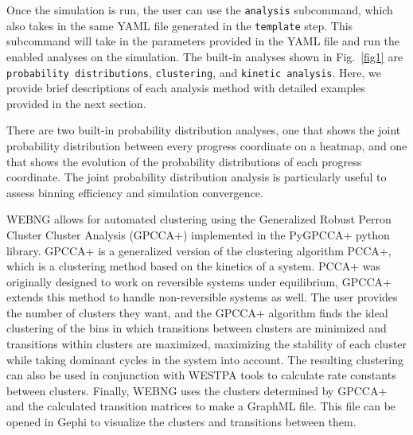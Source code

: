 \documentclass[10pt,letterpaper]{article}
\begin{document}
Once the simulation is run, the user can use the \texttt{analysis} subcommand, which also takes in the same YAML file generated in the \texttt{template} step. This subcommand will take in the parameters provided in the YAML file and run the enabled analyses on the simulation. The built-in analyses shown in Fig.~\ref{fig1} are \texttt{probability distributions}, \texttt{clustering}, and \texttt{kinetic analysis}. Here, we provide brief descriptions of each analysis method with detailed examples provided in the next section. 

There are two built-in probability distribution analyses, one that shows the joint probability distribution between every progress coordinate on a heatmap, and one that shows the evolution of the probability distributions of each progress coordinate. The joint probability distribution analysis is particularly useful to assess binning efficiency and simulation convergence. 

WEBNG allows for automated clustering using the Generalized Robust Perron Cluster Cluster Analysis (GPCCA+)\cite{pygpcca1} implemented in the PyGPCCA+ python library\cite{pygpcca2}. GPCCA+ is a generalized version of the clustering algorithm PCCA+\cite{PCCAp1,PCCAp2}, which is a clustering method based on the kinetics of a system. PCCA+ was originally designed to work on reversible systems under equilibrium, GPCCA+ extends this method to handle non-reversible systems as well. The user provides the number of clusters they want, and the GPCCA+ algorithm finds the ideal clustering of the bins in which transitions between clusters are minimized and transitions within clusters are maximized, maximizing the stability of each cluster while taking dominant cycles in the system into account. The resulting clustering can also be used in conjunction with WESTPA tools to calculate rate constants between clusters. Finally, WEBNG uses the clusters determined by GPCCA+ and the calculated transition matrices to make a GraphML file\cite{graphml}. This file can be opened in Gephi\cite{gephi} to visualize the clusters and transitions between them.

\end{document}
